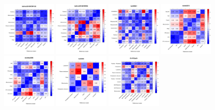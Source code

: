 \documentclass[12pt]{article}\usepackage[]{graphicx}\usepackage[]{color}
\begin{document}
\begin{figure}[p]
  \includegraphics[width = 0.24\textwidth]{./figure/allhmaps-13.pdf}
  \includegraphics[width = 0.24\textwidth]{./figure/allhmaps-14.pdf}
  \includegraphics[width = 0.24\textwidth]{./figure/allhmaps-15.pdf}
  \includegraphics[width = 0.24\textwidth]{./figure/allhmaps-16.pdf}
  \includegraphics[width = 0.24\textwidth]{./figure/allhmaps-17.pdf}
  \includegraphics[width = 0.24\textwidth]{./figure/allhmaps-18.pdf}
  \includegraphics[width = 0.24\textwidth]{./figure/allhmaps-19.pdf}

\end{figure}
\end{document}
